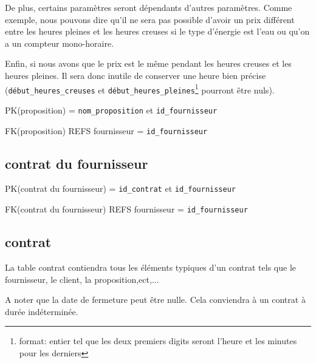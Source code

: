 \begin{flushleft}
De plus, certains paramètres seront dépendants d'autres paramètres. Comme exemple, nous pouvons dire qu'il ne sera pas possible d'avoir  un prix différent entre les heures pleines et les heures creuses si le type d'énergie est l'eau ou qu'on a un compteur mono-horaire.
\end{flushleft}

\begin{flushleft}
Enfin, si nous avons que le prix est le même pendant les heures creuses et les heures pleines. Il sera donc inutile de conserver une heure bien précise (\texttt{début\_heures\_creuses} et \texttt{début\_heures\_pleines}\footnote{format: entier tel que les deux premiers digits seront l'heure et les minutes pour les derniers} pourront être nuls).
\end{flushleft}

\begin{flushleft}
PK(proposition) = \texttt{nom\_proposition} et \texttt{id\_fournisseur}
\end{flushleft}

\begin{flushleft}
FK(proposition) REFS fournisseur = \texttt{id\_fournisseur}
\end{flushleft}
\subsection{contrat du fournisseur}
\begin{flushleft}
PK(contrat du fournisseur) = \texttt{id\_contrat} et \texttt{id\_fournisseur}
\end{flushleft}

\begin{flushleft}
FK(contrat du fournisseur) REFS fournisseur = \texttt{id\_fournisseur}
\end{flushleft}
\subsection{contrat}
\begin{flushleft}
La table contrat contiendra tous les éléments typiques d'un contrat tels que le fournisseur, le client, la proposition,ect,...
\end{flushleft}

\begin{flushleft}
A noter que la date de fermeture peut être nulle. Cela conviendra à un contrat à durée indéterminée.
\end{flushleft}

